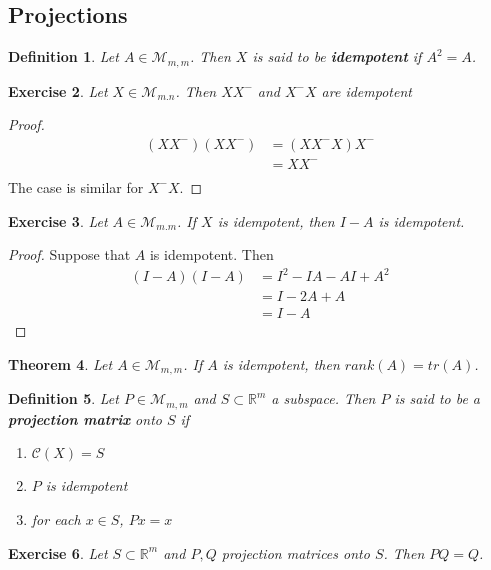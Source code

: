 \documentclass[12pt]{amsart}
\newtheorem{thm}{Theorem}[section]
\newtheorem{defn}[thm]{Definition}
\newtheorem{ex}[thm]{Exercise}
\newcommand{\R}{\mathbb{R}}
\newcommand{\MC}{\mathcal{C}}
\newcommand{\MM}{\mathcal{M}}
\begin{document}
\subsection{Projections}

\begin{defn}
Let $A \in \MM_{m,m}$. Then $X$ is said to be \textbf{idempotent} if $A^2 = A$.
\end{defn}

\begin{ex}
Let $X \in \MM_{m.n}$. Then $XX^-$ and $X^-X$ are idempotent
\end{ex}

\begin{proof}
\begin{align*}
(XX^-)(XX^-) 
&= (XX^-X)X^- \\
&= XX^-\\
\end{align*} The case is similar for $X^-X$.
\end{proof}

\begin{ex}
Let $A \in \MM_{m.m}$. If $X$ is idempotent, then $I-A$ is idempotent.
\end{ex}

\begin{proof} 
Suppose that $A$ is idempotent. Then
\begin{align*}
(I-A)(I-A) 
&= I^2 -IA -AI + A^2 \\
&= I -2A +A \\
&= I -A
\end{align*}
\end{proof}

\begin{thm}
Let $A \in \MM_{m,m}$. If $A$ is idempotent, then $rank(A) = tr(A)$.
\end{thm}

\begin{defn}
Let $P \in \MM_{m,m}$ and $S \subset \R^m$ a subspace. Then $P$ is said to be a \textbf{projection matrix} onto $S$ if 
\begin{enumerate}
\item $\MC(X) = S$ 
\item $P$ is idempotent
\item for each $x \in S$, $Px = x$
\end{enumerate} 
\end{defn}

\begin{ex}
Let $S \subset \R^m$ and $P,Q$ projection matrices onto $S$. Then $PQ = Q$. 
\end{ex}
\end{document}
